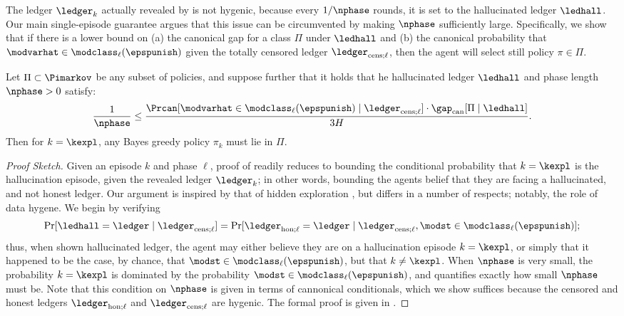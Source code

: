 The ledger $\ledger_k$ actually revealed by \mdphh{} is not hygenic, because every $1/\nphase$ rounds, it is set to the hallucinated ledger $\ledhall$. Our main single-episode guarantee argues that this issue can be circumvented by making $\nphase$ sufficiently large. Specifically, we show that if there is a lower bound on (a) the  canonical gap for a class $\Pi$ under $\ledhall$ and (b) the canonical probability that $\modvarhat \in \modclass_{\ell}(\epspunish)$ given the totally censored ledger $\ledcensl$, then the agent will select still policy $\pi \in \Pi$.
\begin{proposition}\label{prop:mdp_hh} Let $\Pi \subset \Pimarkov$ be any subset of policies, and  suppose further that it holds that he hallucinated ledger  $\ledhall$ and phase length $\nphase > 0$ satisfy:
\begin{align}
\frac{1}{\nphase} \le \frac{\Prcan[\modvarhat \in \modclass_{\ell}(\epspunish) \mid \ledcensl] \cdot \gapcan[\Pi \mid \ledhall] }{3 H }. \label{eq:HH_good_condition}
\end{align}
Then for $k = \kexpl$, any Bayes greedy policy $\pi_k$ must lie in $\Pi$.
\end{proposition}
\begin{proof}[Proof Sketch] Given an episode $k$ and phase $\ell$, proof of  readily reduces to bounding the conditional probability that $k = \kexpl$ is the hallucination episode, given the revealed ledger $\ledger_k$; in other words, bounding the agents belief that they are facing a hallucinated, and not honest ledger. Our argument is inspired by that of hidden exploration \cite{mansour2020bayesian}, but differs in a number of respects; notably, the role of data hygene. We begin by verifying
\begin{align}
\Pr[\ledhall = \ledger \mid \ledcensl] = \Pr[\ledhonl = \ledger \mid \ledcensl, \modst \in \modclass_{\ell}(\epspunish)];
\end{align}
thus, when shown hallucinated ledger, the agent may either believe they are on a hallucination episode $k = \kexpl$, or simply that it happened to be the case, by chance, that $\modst \in \modclass_{\ell}(\epspunish)$, but that $k \ne \kexpl$. When $\nphase$ is very small, the probability $k = \kexpl$ is dominated by the probability $\modst \in \modclass_{\ell}(\epspunish)$, and  quantifies exactly how small $\nphase$ must be. Note that this condition on $\nphase$ is given in terms of cannonical conditionals, which we show suffices because the censored and honest ledgers $\ledhonl$ and $\ledcensl$ are hygenic.  The formal proof is given in .
\end{proof}


